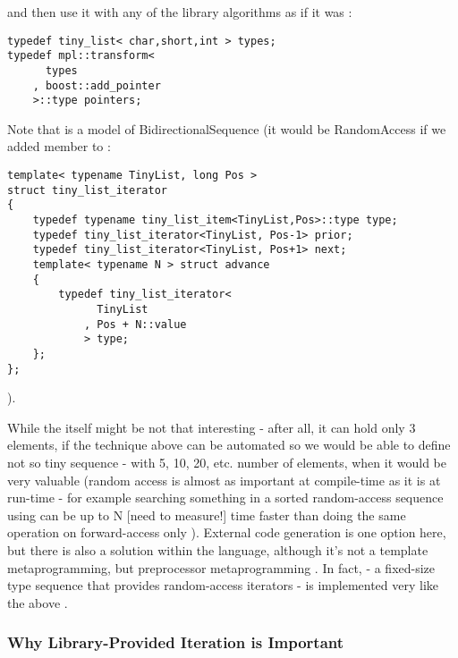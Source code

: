 \documentclass{kapproc}
\begin{document}
and then use it with any of the library algorithms as if it 
was :

{\small
\begin{codesamp}\begin{verbatim}
typedef tiny_list< char,short,int > types;
typedef mpl::transform<
      types
    , boost::add_pointer
    >::type pointers;
\end{verbatim}
\end{codesamp}
}

Note that  is a model of 
BidirectionalSequence (it would be RandomAccess if 
we added  member to :

{\small
\begin{codesamp}\begin{verbatim}
template< typename TinyList, long Pos >
struct tiny_list_iterator
{
    typedef typename tiny_list_item<TinyList,Pos>::type type;
    typedef tiny_list_iterator<TinyList, Pos-1> prior;
    typedef tiny_list_iterator<TinyList, Pos+1> next;
    template< typename N > struct advance
    {
        typedef tiny_list_iterator<
              TinyList
            , Pos + N::value
            > type;
    };
};
\end{verbatim}
\end{codesamp}
}

).

While the  itself might be not that 
interesting - after all, it can hold only 3 elements, if 
the technique above can be automated so we would be able to 
define not so tiny sequence - with 5, 10, 20, etc. number 
of elements, when it would be very valuable (random access 
is almost as important at compile-time as it is at run-time 
- for example searching something in a sorted random-access 
sequence using  can be up to N 
[need to measure!] time faster than doing the same operation 
on forward-access only ). External code generation 
is one option here, but there is also a solution within the 
language, although it's not a template metaprogramming, 
but preprocessor metaprogramming \cite{PRE}. In fact, 
 - a fixed-size type sequence that 
provides random-access iterators - is implemented very like 
the above . 

\subsubsection{Why Library-Provided Iteration is Important}
\end{document}
